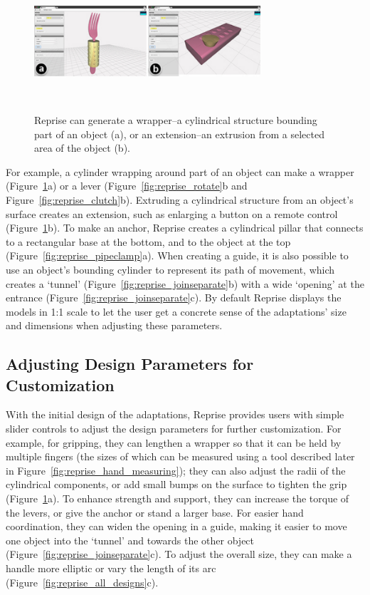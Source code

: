 \begin{figure}[b]
  \vskip 5pt
  \centering
  \includegraphics[width=0.75\textwidth]{figures/reprise_wrapper_v1.pdf}
  \caption{Reprise can generate a wrapper--a cylindrical structure bounding part of an object (a), or an extension--an extrusion from a selected area of the object (b).}~\label{fig:reprise_wrapper}
\end{figure}

For example, a cylinder wrapping around part of an object can make a wrapper (Figure~\ref{fig:reprise_wrapper}a) or a lever (Figure~\ref{fig:reprise_rotate}b and Figure~\ref{fig:reprise_clutch}b). Extruding a cylindrical structure from an object's surface creates an extension, such as enlarging a button on a remote control (Figure~\ref{fig:reprise_wrapper}b). To make an anchor, Reprise creates a cylindrical pillar that connects to a rectangular base at the bottom, and to the object at the top (Figure~\ref{fig:reprise_pipeclamp}a). When creating a guide, it is also possible to use an object's bounding cylinder to represent its path of movement, which creates a `tunnel' (Figure~\ref{fig:reprise_joinseparate}b) with a wide `opening' at the entrance (Figure~\ref{fig:reprise_joinseparate}c). By default Reprise displays the models in 1:1 scale to let the user get a concrete sense of the adaptations' size and dimensions when adjusting these parameters.

\subsection{Adjusting Design Parameters for Customization}
With the initial design of the adaptations, Reprise provides users with simple slider controls to adjust the design parameters for further customization. For example, for gripping, they can lengthen a wrapper so that it can be held by multiple fingers (the sizes of which can be measured using a tool described later in Figure~\ref{fig:reprise_hand_measuring}); they can also adjust the radii of the cylindrical components, or add small bumps on the surface to tighten the grip (Figure~\ref{fig:reprise_wrapper}a). To enhance strength and support, they can increase the torque of the levers, or give the anchor or stand a larger base. For easier hand coordination, they can widen the opening in a guide, making it easier to move one object into the `tunnel' and towards the other object (Figure~\ref{fig:reprise_joinseparate}c). To adjust the overall size, they can make a handle more elliptic or vary the length of its arc (Figure~\ref{fig:reprise_all_designs}c).

